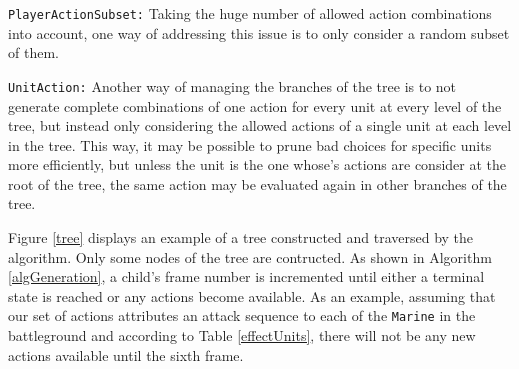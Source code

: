\begin{shortitem}
\item \texttt{PlayerActionSubset:}
	Taking the huge number of allowed action combinations into account, one way of addressing this issue is to only consider a random subset of them.
\item \texttt{UnitAction:}
	Another way of managing the branches of the tree is to not generate complete combinations of one action for every unit at every level of the tree, but instead only considering the allowed actions of a single unit at each level in the tree.
	This way, it may be possible to prune bad choices for specific units more efficiently, but unless the unit is the one whose's actions are consider at the root of the tree, the same action may be evaluated again in other branches of the tree.
\end{shortitem}

Figure \ref{tree} displays an example of a tree constructed and traversed by the algorithm. Only some nodes of the tree are contructed.
As shown in Algorithm \ref{algGeneration}, a child's frame number is incremented until either a terminal state is reached or any actions become available.
As an example, assuming that our set of actions attributes an attack sequence to each of the \texttt{Marine} in the battleground and according to Table \ref{effectUnits}, there will not be any new actions available until the sixth frame.

